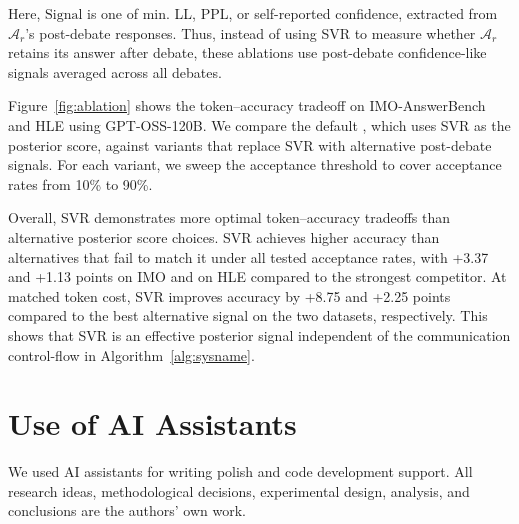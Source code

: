 Here, $\text{Signal}$ is one of min. LL, PPL, or self-reported confidence, extracted from $\mathcal{A}_r$'s post-debate responses. Thus, instead of using SVR to measure whether $\mathcal{A}_r$ retains its answer after debate, these ablations use post-debate confidence-like signals averaged across all debates.

Figure~\ref{fig:ablation} shows the token--accuracy tradeoff on IMO-AnswerBench and HLE using GPT-OSS-120B. We compare the default \sysname, which uses SVR as the posterior score, against variants that replace SVR with alternative post-debate signals. For each variant, we sweep the acceptance threshold to cover acceptance rates from 10\% to 90\%.

Overall, SVR demonstrates more optimal token--accuracy tradeoffs than alternative posterior score choices. SVR achieves higher accuracy than alternatives that fail to match it under all tested acceptance rates, with +3.37 and +1.13 points on IMO and on HLE compared to the strongest competitor. At matched token cost, SVR improves accuracy by +8.75 and +2.25 points compared to the best alternative signal on the two datasets, respectively. This shows that SVR is an effective posterior signal independent of the communication control-flow in Algorithm~\ref{alg:sysname}.

\section{Use of AI Assistants}

We used AI assistants for writing polish and code development support. All research ideas, methodological decisions, experimental design, analysis, and conclusions are the authors' own work.
